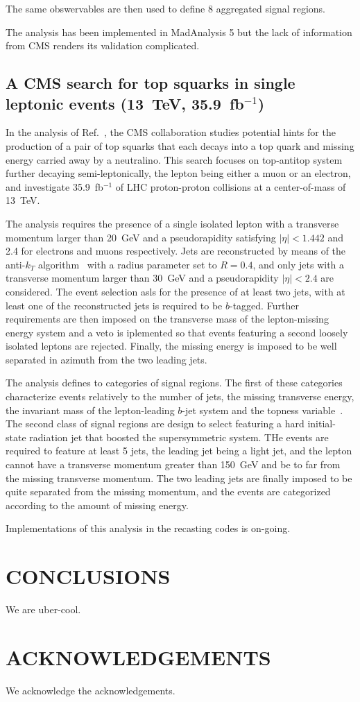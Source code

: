 \documentclass[11pt]{cernrep}
\begin{document}
The same obswervables are then used to define 8 aggregated signal regions.

The analysis has been implemented in MadAnalysis 5 but the lack of
information from CMS renders its validation complicated.


\subsection{A CMS search for top squarks in single leptonic events (13~TeV,
  35.9~fb$^{-1}$)}

In the analysis of Ref.~\cite{Sirunyan:2017xse}, the CMS collaboration studies
potential hints for the production of a pair of top squarks that each decays
into a top quark and missing energy carried away by a neutralino. This search
focuses on top-antitop system further decaying semi-leptonically, the lepton
being either a muon or an electron, and investigate 35.9~fb$^{-1}$ of LHC
proton-proton collisions at a center-of-mass of 13~TeV.

The analysis requires the presence of a single isolated lepton with a transverse
momentum larger than 20~GeV and a pseudorapidity satisfying $|\eta| < 1.442$ and
2.4 for electrons and muons respectively. Jets are reconstructed by means of the
anti-$k_T$ algorithm~\cite{Cacciari:2008gp} with a radius parameter set to
$R=0.4$, and only jets with a transverse momentum larger than 30~GeV and a
pseudorapidity $|\eta| < 2.4$ are considered. The event selection asls for the
presence of at least two jets, with at least one of the reconstructed
jets is required to be $b$-tagged. Further requirements are then imposed on the
transverse mass of the lepton-missing energy system and a veto is iplemented so
that events featuring a second loosely isolated leptons are rejected. Finally,
the missing energy is imposed to be well separated in azimuth from the two
leading jets.

The analysis defines to categories of signal regions. The first of these
categories characterize events relatively to the number of jets, the missing
transverse energy, the invariant mass of the lepton-leading $b$-jet system and
the topness variable~\cite{topness}. The second class of signal regions are
design to select featuring a hard initial-state radiation jet that boosted the
supersymmetric system. THe events are required to feature at least 5 jets, the
leading jet being a light jet, and the lepton cannot have a transverse momentum
greater than 150~GeV and be to far from the missing transverse momentum. The
two leading jets are finally imposed to be quite separated from the missing
momentum, and the events are categorized according to the amount of missing
energy.

Implementations of this analysis in the recasting codes is on-going. 



\section*{CONCLUSIONS}
We are uber-cool.

\section*{ACKNOWLEDGEMENTS}
We acknowledge the acknowledgements.


\end{document}
